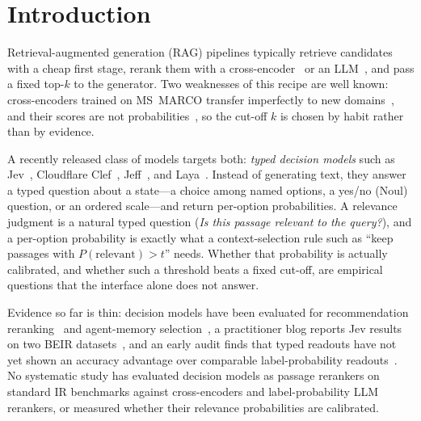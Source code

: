 \section{Introduction}

Retrieval-augmented generation (RAG) pipelines typically retrieve candidates with a cheap first stage, rerank them with a cross-encoder~\cite{nogueira2019monobert} or an LLM~\cite{sun2023rankgpt}, and pass a fixed top-$k$ to the generator.
Two weaknesses of this recipe are well known: cross-encoders trained on MS~MARCO transfer imperfectly to new domains~\cite{thakur2021beir}, and their scores are not probabilities~\cite{penha2021calibration}, so the cut-off $k$ is chosen by habit rather than by evidence.

A recently released class of models targets both: \emph{typed decision models} such as Jev~\cite{jev}, Cloudflare Clef~\cite{clef}, Jeff~\cite{jeff}, and Laya~\cite{laya}.
Instead of generating text, they answer a typed question about a state---a choice among named options, a yes/no (Noul) question, or an ordered scale---and return per-option probabilities.
A relevance judgment is a natural typed question (\emph{Is this passage relevant to the query?}), and a per-option probability is exactly what a context-selection rule such as ``keep passages with $P(\text{relevant})>t$'' needs. Whether that probability is actually calibrated, and whether such a threshold beats a fixed cut-off, are empirical questions that the interface alone does not answer.

Evidence so far is thin: decision models have been evaluated for recommendation reranking~\cite{lyu2026jevrec} and agent-memory selection~\cite{sharma2026selection}, a practitioner blog reports Jev results on two BEIR datasets~\cite{denser2026jevqwen}, and an early audit finds that typed readouts have not yet shown an accuracy advantage over comparable label-probability readouts~\cite{tang2026tdmaudit}.
No systematic study has evaluated decision models as passage rerankers on standard IR benchmarks against cross-encoders and label-probability LLM rerankers, or measured whether their relevance probabilities are calibrated.

